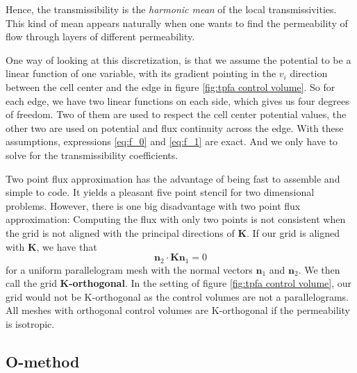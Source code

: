 \documentclass[../Main/main.tex]{subfiles}
\begin{document}
	Hence, the transmissibility is the \emph{harmonic mean} of the local transmissivities. This kind of mean appears naturally when one wants to find the permeability of flow through layers of different permeability.
	\par
	  One way of looking at this discretization, is that we assume the potential to be a linear function of one variable, with its gradient pointing in the $v_i$ direction between the cell center and the edge in figure \ref{fig:tpfa control volume}. So for each edge, we have two linear functions on each side, which gives us four degrees of freedom. Two of them are used to respect the cell center potential values, the other two are used on potential and flux continuity across the edge. With these assumptions, expressions \eqref{eq:f_0} and \eqref{eq:f_1} are exact. And we only have to solve for the transmissibility coefficients.\par
	 Two point flux approximation has the advantage of being fast to assemble and simple to code. It yields a pleasant five point stencil for two dimensional problems. However, there is one big disadvantage with two point flux approximation: Computing the flux with only two points is not consistent when the grid is not aligned with the principal directions of $\bm{K}$. If our grid is aligned with $\bm{K}$, we have that 
	\begin{equation}
		\bm{n}_2 \cdot \bm{K}\bm{n}_1 = 0
	\end{equation}
	for a uniform parallelogram mesh with the normal vectors $\bm{n}_1$ and $\bm{n}_2$. We then call the grid \textbf{K-orthogonal}. 
	 In the setting of figure \ref{fig:tpfa control volume}, our grid would not be K-orthogonal as the control volumes are not a parallelograms. All meshes with orthogonal control volumes are K-orthogonal if the permeability is isotropic.
	\subsection{O-method}
\end{document}
